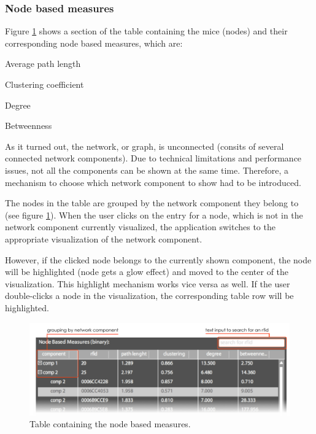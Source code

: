 \subsubsection*{Node based measures}

Figure \ref{fig:node_based_measures} shows a section of the table containing the mice (nodes) and their corresponding node based measures, which are:

\begin{mylist}
\item Average path length
\item Clustering coefficient
\item Degree
\item Betweenness
\end{mylist}

As it turned out, the network, or graph, is unconnected (consits of several connected network components). Due to technical limitations and performance issues, not all the components can be shown at the same time. Therefore, a mechanism to choose which network component to show had to be introduced.

The nodes in the table are grouped by the network component they belong to (see figure \ref{fig:node_based_measures}). When the user clicks on the entry for a node, which is not in the network component currently visualized, the application switches to the appropriate visualization of the network component.

However, if the clicked node belongs to the currently shown component, the node will be highlighted (node gets a glow effect) and moved to the center of the visualization. This highlight mechanism works vice versa as well. If the user double-clicks a node in the visualization, the corresponding table row will be highlighted.

\begin{figure}[!htpb]
\begin{center}
  \includegraphics[width=\textwidth]{assets/pdf/node_based_measures.pdf}
  \caption[Node based measures]{Table containing the node based measures.}
  \label{fig:node_based_measures}
\end{center}
\end{figure}

